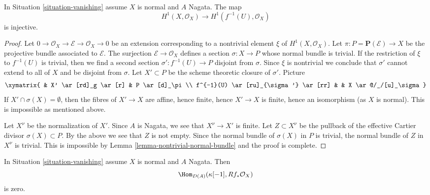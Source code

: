 \begin{lemma}
\label{lemma-H1-injective}
In Situation \ref{situation-vanishing} assume $X$ is normal
and $A$ Nagata. The map
$$
H^1(X, \mathcal{O}_X) \longrightarrow H^1(f^{-1}(U), \mathcal{O}_X)
$$
is injective.
\end{lemma}

\begin{proof}
Let $0 \to \mathcal{O}_X \to \mathcal{E} \to \mathcal{O}_X \to 0$ be an
extension corresponding to a nontrivial element $\xi$ of
$H^1(X, \mathcal{O}_X)$. Let $\pi : P = \mathbf{P}(\mathcal{E}) \to X$
be the projective bundle associated to $\mathcal{E}$.
The surjection $\mathcal{E} \to \mathcal{O}_X$
defines a section $\sigma : X \to P$ whose normal bundle is trivial.
If the restriction of $\xi$ to $f^{-1}(U)$ is trivial, then we
find a second section $\sigma' : f^{-1}(U) \to P$ disjoint from $\sigma$.
Since $\xi$ is nontrivial we conclude that $\sigma'$ cannot extend
to all of $X$ and be disjoint from $\sigma$. Let $X' \subset P$ be the
scheme theoretic closure of $\sigma'$. Picture
$$
\xymatrix{
& X' \ar[rd]_g \ar[r] & P \ar[d]_\pi \\
f^{-1}(U) \ar[ru]_{\sigma'} \ar[rr] & & X \ar@/_/[u]_\sigma
}
$$
If $X' \cap \sigma(X) = \emptyset$, then the fibres of $X' \to X$
are affine, hence finite, hence $X' \to X$ is finite, hence an isomorphism
(as $X$ is normal). This is impossible as mentioned above.

\medskip\noindent
Let $X^\nu$ be the normalization of $X'$. Since $A$ is Nagata, we see
that $X^\nu \to X'$ is finite. Let $Z \subset X^\nu$ be the pullback
of the effective Cartier divisor $\sigma(X) \subset P$. By the above
we see that $Z$ is not empty. Since the normal
bundle of $\sigma(X)$ in $P$ is trivial, the normal bundle of $Z$
in $X^\nu$ is trivial. This is impossible by
Lemma \ref{lemma-nontrivial-normal-bundle}
and the proof is complete.
\end{proof}

\begin{lemma}
\label{lemma-R1-injective}
In Situation \ref{situation-vanishing} assume $X$ is normal and $A$ Nagata.
Then
$$
\Hom_{D(A)}(\kappa[-1], Rf_*\mathcal{O}_X)
$$
is zero.
\end{lemma}

